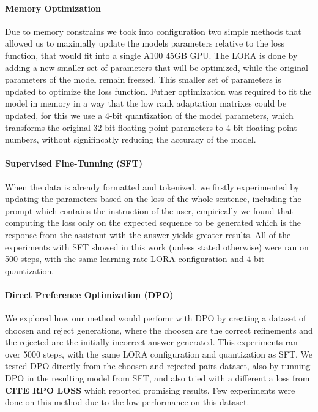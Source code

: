 \documentclass[a4paper,10pt]{article}
\begin{document}
\paragraph {Memory Optimization}
Due to memory constrains we took into configuration two simple methods that allowed us to maximally update the models parameters relative to the loss function, that would fit into a single A100 45GB GPU. The LORA is done by adding a new smaller set of parameters that will be optimized, while the original parameters of the model remain freezed. This smaller set of parameters is updated to optimize the loss function. Futher optimization was required to fit the model in memory in a way that the low rank adaptation matrixes could be updated, for this we use a 4-bit quantization of the model parameters, which transforms the original 32-bit floating point parameters to 4-bit floating point numbers, without signifincatly reducing the accuracy of the model. 
\paragraph{Supervised Fine-Tunning (SFT)}
When the data is already formatted and tokenized, we firstly experimented by updating the parameters based on the loss of the whole sentence, including the prompt which contains the instruction of the user, empirically we found that computing the loss only on the expected sequence to be generated which is the response from the assistant with the answer yields greater results. All of the experiments with SFT showed in this work (unless stated otherwise) were ran on 500 steps, with the same learning rate LORA configuration and 4-bit quantization.
\paragraph{Direct Preference Optimization (DPO)}
We explored how our method would perfomr with DPO by creating a dataset of choosen and reject generations, where the choosen are the correct refinements and the rejected are the initially incorrect answer generated. This experiments ran over 5000 steps, with the same LORA configuration and quantization as SFT. We tested DPO directly from the choosen and rejected pairs dataset, also by running DPO in the resulting model from SFT, and also tried with a different a loss from \textbf{CITE RPO LOSS} which reported promising results. Few experiments were done on this method due to the low performance on this dataset.
\end{document}
